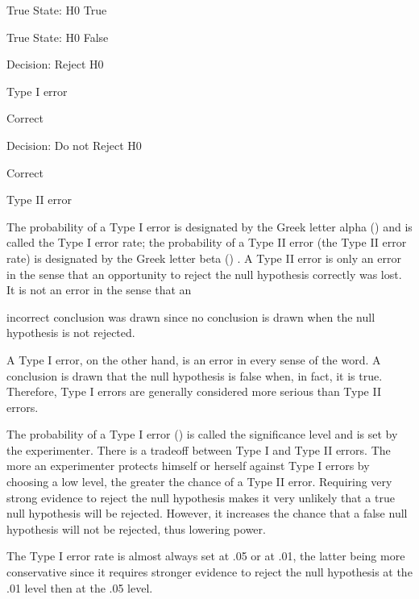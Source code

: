 True State: H0 True
 

True State: H0 False
 



Decision: Reject H0
 

Type I error
 

Correct
 



Decision: Do not Reject H0
 

Correct 
 

Type II error
 



The probability of a Type I error is designated by the Greek letter alpha () and is called the Type I error rate; the probability of a Type II error (the Type II error rate) is designated by the Greek letter beta () . A Type II error is only an error in the sense that an opportunity to reject the null hypothesis correctly was lost. It is not an error in the sense that an

incorrect conclusion was drawn since no conclusion is drawn when the null hypothesis is not rejected.


A Type I error, on the other hand, is an error in every sense of the word. A conclusion is drawn that the null hypothesis is false when, in fact, it is true. Therefore, Type I errors are generally considered more serious than Type II errors. 


The probability of a Type I error () is called the significance level and is set by the experimenter. There is a tradeoff between Type I and Type II errors. The more an experimenter protects himself or herself against Type I errors by choosing a low level, the greater the chance of a Type II error. Requiring very strong evidence to reject the null hypothesis makes it very unlikely that a true null hypothesis will be rejected. However, it increases the chance that a false null hypothesis will not be rejected, thus lowering power. 


The Type I error rate is almost always set at .05 or at .01, the latter being more conservative since it requires stronger evidence to reject the null hypothesis at the .01 level then at the .05 level. 

